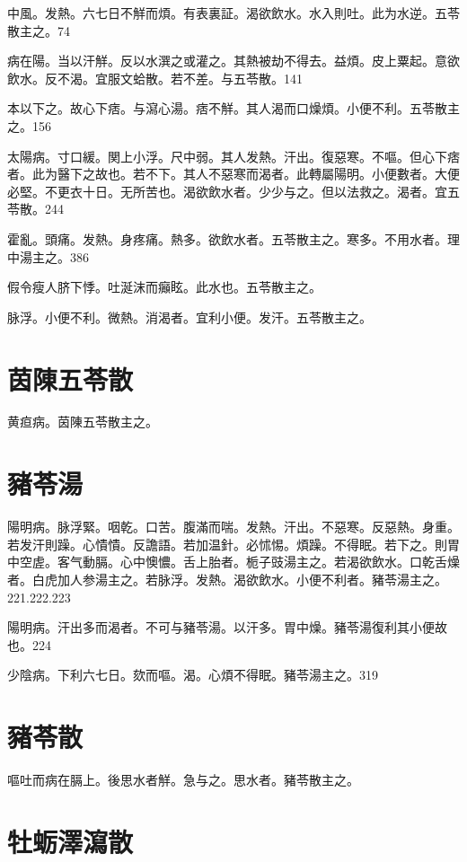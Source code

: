 \documentclass[12pt,twoside,UTF8,b5paper]{ctexbook}
\begin{document}
中風。发熱。六七日不觧而煩。有表裏証。渴欲飲水。水入則吐。此为水逆。五苓散主之。74

病在陽。当以汗觧。反以水潠之或灌之。其熱被劫不得去。益煩。皮上粟起。意欲飲水。反不渴。宜服文蛤散。若不差。与五苓散。141

本以下之。故心下痞。与瀉心湯。痞不觧。其人渴而口燥{煩}。小便不利。五苓散主之。156

太陽病。寸{口}緩。関{上小}浮。尺{中}弱。其人发熱。汗出。復惡寒。不嘔。但心下痞者。此为醫下之故也。若不下。其人不惡寒而渴者。此轉屬陽明。小便數者。大便必堅。不更衣十日。无所苦也。{渴}欲飲水者。少少与之。但以法救之。渴者。宜五苓散。244

霍亂。頭痛。发熱。身疼痛。熱多。欲飲水者。五苓散主之。寒多。不用水者。理中湯主之。386

假令瘦人脐下悸。吐涎沫而癲眩。此水也。五苓散主之。

脉浮。小便不利。微熱。消渴者。宜利小便。发汗。五苓散主之。

\section{茵陳五苓散}

黄疸病。茵陳五苓散主之。

\section{豬苓湯}

陽明病。脉浮緊。咽乾。口苦。腹滿而喘。发熱。汗出。不惡寒。反惡熱。身重。若发汗則躁。心憒憒。反譫語。若加温針。必怵惕。煩躁。不得眠。若下之。則胃中空虗。客气動膈。心中懊憹。舌上胎者。栀子{豉}湯主之。若渴欲飲水。口乾舌燥者。白虎{加人参}湯主之。若脉浮。发熱。渴欲飲水。小便不利者。豬苓湯主之。221.222.223

陽明病。汗出多而渴者。不可与豬苓湯。以汗多。胃中燥。豬苓湯復利其小便故也。224

少陰病。下利六七日。欬而嘔。渴。心煩不得眠。豬苓湯主之。319

\section{豬苓散}

嘔吐而病在膈上。後思水者觧。急与之。思水者。豬苓散主之。

\section{牡蛎澤瀉散}
\end{document}
